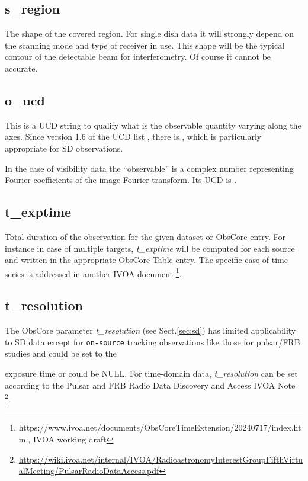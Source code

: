 \documentclass[11pt,a4paper]{ivoa}
\begin{document}
\subsection{s\_region}
The shape of the covered region.
For single dish data it will strongly depend on the scanning mode and type of receiver in use.
This shape will be the typical contour of the detectable beam for interferometry. Of course it cannot be accurate.

\subsection{o\_ucd}
This is a UCD string  to qualify what is the observable quantity varying along the axes.
Since version 1.6 of the UCD list \citep{2024ivoa.spec.1218C}, there is
, which is particularly appropriate for SD observations.

In the case of visibility data the ``observable'' is a complex number representing Fourier
coefficients of the image Fourier transform. Its UCD is .

\subsection{t\_exptime}
Total duration of the observation for the given dataset or ObsCore entry. For instance  in case of multiple targets, \emph{t\_exptime}
will be computed for each source and written in the appropriate ObsCore Table entry. The specific case of time series is addressed in another IVOA document \footnote{https://www.ivoa.net/documents/ObsCoreTimeExtension/20240717/index.html, IVOA working draft}.


\subsection{t\_resolution}

The ObsCore parameter \emph{t\_resolution} (see Sect.\ref{sec:sd}) has limited applicability to SD data
except for \texttt{on-source} tracking observations like those for pulsar/FRB studies and could be set to the

exposure time or could be NULL. For time-domain data, \emph{t\_resolution} can be set according to the Pulsar
and FRB Radio Data Discovery and Access IVOA Note \footnote{\url{https://wiki.ivoa.net/internal/IVOA/RadioastronomyInterestGroupFifthVirtualMeeting/PulsarRadioDataAccess.pdf}}.
\end{document}
